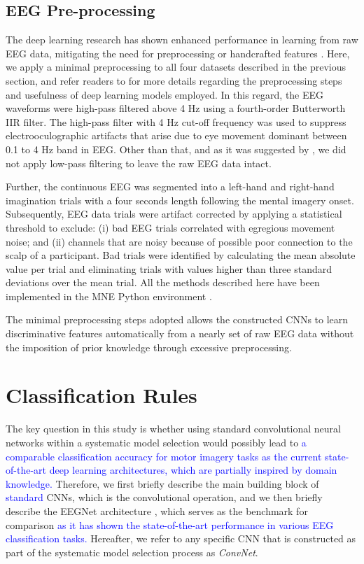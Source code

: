 \documentclass{ieeeaccess}
\begin{document}
    \subsection{EEG Pre-processing}
    \label{preprocessing}
The deep learning research has shown enhanced performance in learning from raw EEG data, mitigating the need for preprocessing or handcrafted features \cite{Schirrmeister2017, craik2019deep, zhang2019survey}. 
Here, we apply a minimal preprocessing to all four datasets described in the previous section, and refer readers to \cite{lawhern2016eegnet, Schirrmeister2017} for more details regarding the  preprocessing steps and usefulness of deep learning models employed. In this regard, the EEG waveforms were high-pass filtered above 4 Hz using a fourth-order Butterworth IIR filter. The high-pass filter with 4 Hz cut-off frequency was used to suppress electrooculographic artifacts that arise due to eye movement dominant between 0.1 to 4 Hz band in EEG. Other than that, and as it was suggested by \cite{Schirrmeister2017}, we did not apply low-pass filtering to leave the raw EEG data intact. 

Further, the continuous EEG was segmented into a left-hand and right-hand imagination trials with a four seconds length following the mental imagery onset. Subsequently, EEG data trials were artifact corrected by applying a statistical threshold to exclude: (i) bad EEG trials correlated with egregious movement noise; and (ii) channels that are noisy because of possible poor connection to the scalp of a participant. Bad trials were identified by calculating the mean absolute value per trial and eliminating trials with values higher than three standard deviations over the mean trial. All the methods described here have been implemented in the MNE Python environment \cite{gramfort2013meg}. 

The minimal preprocessing steps adopted allows the constructed CNNs to learn discriminative features automatically from a nearly set of raw EEG data without the imposition of prior knowledge through excessive preprocessing.
    
    \section{Classification Rules}
    \label{classificationrules}
    {The key question in this study is whether using standard convolutional neural networks within a systematic model selection would possibly lead to \textcolor{blue}{a comparable classification accuracy for motor imagery tasks as the current state-of-the-art deep learning architectures, which are partially inspired by domain knowledge.} Therefore, we first briefly describe the main building block of \textcolor{blue}{standard} CNNs, which is the convolutional operation, and we then briefly describe the EEGNet architecture \cite{lawhern2016eegnet}, which serves as the benchmark for comparison \textcolor{blue}{ as it has shown the state-of-the-art performance in various EEG classification tasks.} Hereafter, we refer to any specific CNN that is constructed as part of the systematic model selection process as \textit{ConvNet}. } 
    
\end{document}
